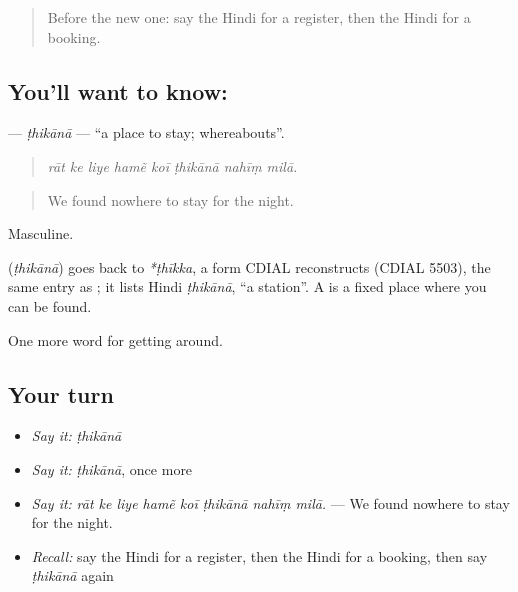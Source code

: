 \label{lesson:HI-C415-thikana}



\begin{quote}
Before the new one: say the Hindi for a register, then the Hindi for a booking.
\end{quote}

\subsection*{You'll want to know: }
\textbf{} — \emph{ṭhikānā} — \textquotedblleft{}a place to stay; whereabouts\textquotedblright{}.

\begin{quote}
       
\end{quote}

\begin{quote}
\emph{rāt ke liye hamẽ koī ṭhikānā nahīṃ milā.}
\end{quote}

\begin{quote}
We found nowhere to stay for the night.
\end{quote}

Masculine.

\begin{cousinweb}
\textbf{} (\emph{ṭhikānā}) goes back to \emph{*ṭhīkka}, a form CDIAL reconstructs (CDIAL 5503), the same entry as ; it lists Hindi \emph{ṭhikānā}, \textquotedblleft{}a station\textquotedblright{}. A  is a fixed place where you can be found.
\end{cousinweb}

\begin{grammarlens}[title={What you've built}]
One more word for getting around.
\end{grammarlens}

\subsection*{Your turn}
\begin{itemize}
\raggedright
  \item \emph{Say it:} \emph{ṭhikānā}
  \item \emph{Say it:} \emph{ṭhikānā}, once more
  \item \emph{Say it:} \emph{rāt ke liye hamẽ koī ṭhikānā nahīṃ milā.} — We found nowhere to stay for the night.
  \item \emph{Recall:} say the Hindi for a register, then the Hindi for a booking, then say \emph{ṭhikānā} again
\end{itemize}

